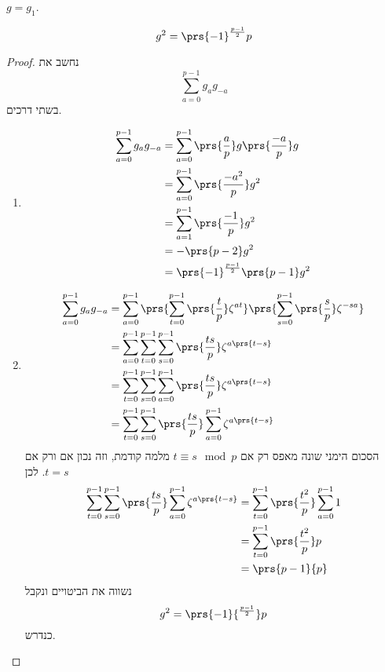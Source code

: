 \documentclass[a4paper,10pt,twoside,openany]{book}
\begin{document}
\begin{notation}
$g = g_1$.
\end{notation}

\begin{theorem}
\[g^2 = \prs{-1}^{\frac{p-1}{2}} p\]
\end{theorem}
\begin{proof}
נחשב את
\[\sum_{a=0}^{p-1} g_a g_{-a}\]
בשתי דרכים.

\begin{enumerate}
\item \begin{align*}
\sum_{a=0}^{p-1} g_a g_{-a} &= \sum_{a=0}^{p-1} \prs{\frac{a}{p}} g \prs{\frac{-a}{p}} g \\&= \sum_{a=0}^{p-1} \prs{\frac{-a^2}{p}} g^2 \\&=
\sum_{a=1}^{p-1} \prs{\frac{-1}{p}}g^2 \\&= -\prs{p-2}g^2 \\
&= \prs{-1}^{\frac{p-1}{2}} \prs{p-1} g^2
\end{align*}
\item
\begin{align*}
\sum_{a=0}^{p-1} g_a g_{-a} &= \sum_{a=0}^{p-1} \prs{\sum_{t=0}^{p-1} \prs{\frac{t}{p}} \zeta^{at}} \prs{\sum_{s=0}^{p-1} \prs{\frac{s}{p}} \zeta^{-sa}} \\&=
\sum_{a=0}^{p-1} \sum_{t=0}^{p-1} \sum_{s=0}^{p-1} \prs{\frac{ts}{p}} \zeta^{a\prs{t-s}} \\&=
\sum_{t=0}^{p-1} \sum_{s=0}^{p-1} \sum_{a=0}^{p-1} \prs{\frac{ts}{p}} \zeta^{a\prs{t-s}} \\&=
\sum_{t=0}^{p-1} \sum_{s=0}^{p-1} \prs{\frac{ts}{p}} \sum_{a=0}^{p-1} \zeta^{a\prs{t-s}}
\end{align*}
הסכום הימני שונה מאפס רק אם
$t\equiv s \mod{p}$
מלמה קודמת, וזה נכון אם ורק אם
$t=s$.
לכן
\begin{align*}
\sum_{t=0}^{p-1} \sum_{s=0}^{p-1} \prs{\frac{ts}{p}} \sum_{a=0}^{p-1} \zeta^{a\prs{t-s}} &=
\sum_{t=0}^{p-1} \prs{\frac{t^2}{p}} \sum_{a=0}^{p-1} 1 \\&=
\sum_{t=0}^{p-1} \prs{\frac{t^2}{p}}p \\&= \prs{p-1}{p}
\end{align*}
נשווה את הביטויים ונקבל
\[g^2 = \prs{-1}{^\frac{p-1}{2}} p\]
כנדרש.
\end{enumerate}

\end{proof}

\backmatter
\end{document}
